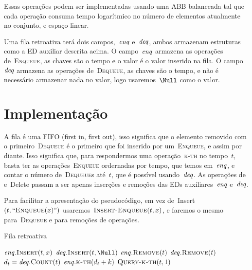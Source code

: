 \documentclass[main.tex]{subfiles}
\begin{document}
Essas operações podem ser implementadas usando uma ABB balanceada tal que cada operação consuma tempo logarítmico no número de elementos atualmente no conjunto, e espaço linear.

\newcommand{\deqs}{\V{deq}}
\newcommand{\enqs}{\V{enq}}

Uma fila retroativa terá dois campos,~$\enqs$ e~$\deqs$, ambos armazenam estruturas como a ED auxiliar descrita acima. O campo~$\enqs$ armazena as operações de~\textsc{Enqueue}, as chaves são o tempo e o valor é o valor inserido na fila. O campo~$\deqs$ armazena as operações de~\textsc{Dequeue}, as chaves são o tempo, e não é necessário armazenar nada no valor, logo usaremos~$\Null$ como o valor.

\section{Implementação}

A fila é uma FIFO (first in, first out), isso significa que o elemento removido com o primeiro~\textsc{Dequeue} é o primeiro que foi inserido por um~\textsc{Enqueue}, e assim por diante. Isso significa que, para respondermos uma operação~\textsc{k-th} no tempo~$t$, basta ter as operações~\textsc{Enqueue} ordernadas por tempo, que temos em~$\enqs$, e contar o número de~\textsc{Dequeue}s até~$t$, que é possível usando~$\deqs$. As operações de~ e~Delete passam a ser apenas inserções e remoções das EDs auxiliares~$\enqs$ e~$\deqs$.

Para facilitar a apresentação do pseudocódigo, em vez de~Insert$(t, ``\Call{Enqueue}{x}")$ usaremos~$\Call{Insert-Enqueue}{t, x}$, e faremos o mesmo para~\textsc{Dequeue} e para remoções de operações.

\begin{algorithm}
\caption{Fila retroativa} \label{lst:filaretro}
\begin{algorithmic}[1]
		\State $\enqs.\Call{Insert}{t, x}$
	\EndFunction
		\State $\deqs.\Call{Insert}{t, \Null}$
	\EndFunction
		\State $\enqs.\Call{Remove}{t}$
	\EndFunction
		\State $\deqs.\Call{Remove}{t}$
	\EndFunction
		\State $d_t = \deqs.\Call{Count}{t}$
		\State \Return $\enqs.\Call{k-th}{d_t + k}$
	\EndFunction
		\State \Return $\Call{Query-k-th}{t, 1}$
	\EndFunction
\end{algorithmic}
\end{algorithm}
\end{document}
